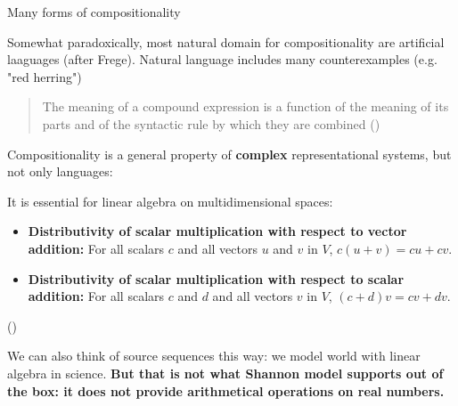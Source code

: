 \documentclass[10pt, aspectratio=169]{beamer}
\begin{document}
\begin{frame}{Many forms of compositionality}

Somewhat paradoxically, most natural domain for compositionality are artificial laaguages (after Frege). Natural language includes many counterexamples (e.g. "red herring")

\begin{quote}
The meaning of a compound expression is a function of the meaning of its parts and of the syntactic rule by which they are combined (\cite{janssen_compositionality_2012,janssen_frege_2001})
\end{quote} 
Compositionality is a general property of \textbf{complex} representational systems, but not only languages:

It is essential for linear algebra on multidimensional spaces:
\begin{itemize}
   
    \item \textbf{Distributivity of scalar multiplication with respect to vector addition:} For all scalars $c$ and all vectors $u$ and $v$ in $V$, $c(u + v) = cu + cv$.
    \item \textbf{Distributivity of scalar multiplication with respect to scalar addition:} For all scalars $c$ and $d$ and all vectors $v$ in $V$, $(c + d)v = cv + dv$.
\end{itemize} (\cite{axler_linear_2024})


We can also think of source sequences this way: we model world with linear algebra in science.
\textbf{\color{red} But that is not what Shannon model supports out of the box: it does not provide arithmetical operations on real numbers.}


\end{frame}
\end{document}
